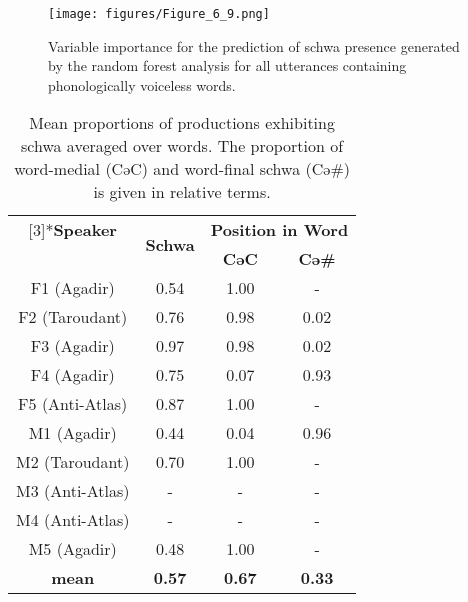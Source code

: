   \begin{figure}
   \texttt{[image: figures/Figure\_6\_9.png]}
  \caption{Variable importance for the prediction of schwa presence generated by the random forest analysis for all utterances containing phonologically voiceless words.}
   \label{fig:6.9}
   \end{figure}

\begin{table}[htbp]
    \begin{tabular}{cccc}
\lsptoprule    
    \multirow{2}[3]{*}{\textbf{Speaker}} & \multirow{2}[3]{*}{\textbf{Schwa}} & \multicolumn{2}{c}{\textbf{Position in Word}} \\
\cmidrule{3-4} & & \textbf{CəC} & \textbf{Cə\#} \\
    \midrule
    F1 (Agadir) &          0.54    &          1.00    &              -      \\
    F2 (Taroudant) &          0.76    &          0.98    &           0.02    \\
    F3 (Agadir) &          0.97    &          0.98    &           0.02    \\
    F4 (Agadir) &          0.75    &          0.07    &           0.93    \\
    F5 (Anti-Atlas) &          0.87    &          1.00    &              -      \\
    \midrule
    M1 (Agadir) &          0.44    &          0.04    &           0.96    \\
    M2 (Taroudant) &          0.70    &          1.00    &              -      \\
    M3 (Anti-Atlas) &              -      &              -      &              -      \\
    M4 (Anti-Atlas) &              -      &              -      &              -      \\
    M5 (Agadir) &          0.48    &          1.00    &              -      \\
    \midrule
    \lspbottomrule
    \textbf{mean} & \textbf{         0.57   } & \textbf{         0.67   } & \textbf{          0.33   } \\
    \end{tabular}
    \caption{Mean proportions of productions exhibiting schwa averaged over words. The proportion of word-medial (CəC) and word-final schwa (Cə\#) is given in relative terms.}
  \label{tab:6.3}
\end{table}

